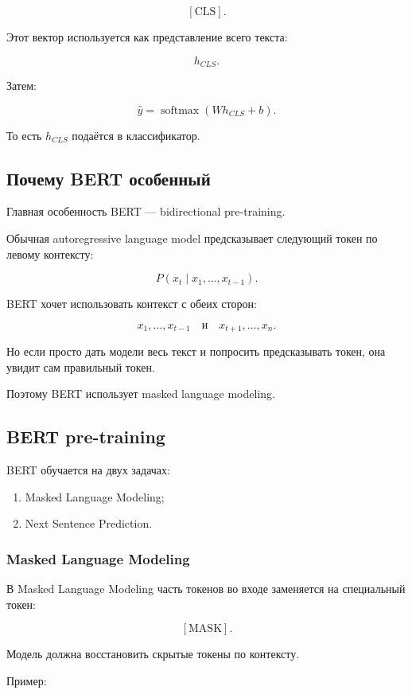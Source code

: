 \documentclass[a4paper,12pt]{article}
\begin{document}
\[
[\text{CLS}].
\]

Этот вектор используется как представление всего текста:

\[
h_{CLS}.
\]

Затем:

\[
\hat{y}
=
\operatorname{softmax}(Wh_{CLS}+b).
\]

То есть \(h_{CLS}\) подаётся в классификатор.

\subsection{Почему BERT особенный}

Главная особенность BERT --- bidirectional pre-training.

Обычная autoregressive language model предсказывает следующий токен по левому контексту:

\[
P(x_t \mid x_1,\dots,x_{t-1}).
\]

BERT хочет использовать контекст с обеих сторон:

\[
x_1,\dots,x_{t-1}
\quad \text{и} \quad
x_{t+1},\dots,x_n.
\]

Но если просто дать модели весь текст и попросить предсказывать токен, она увидит сам правильный токен.

Поэтому BERT использует masked language modeling.

\subsection{BERT pre-training}

BERT обучается на двух задачах:

\begin{enumerate}
    \item Masked Language Modeling;
    \item Next Sentence Prediction.
\end{enumerate}

\subsubsection{Masked Language Modeling}

В Masked Language Modeling часть токенов во входе заменяется на специальный токен:

\[
[\text{MASK}].
\]

Модель должна восстановить скрытые токены по контексту.

Пример:
\end{document}
